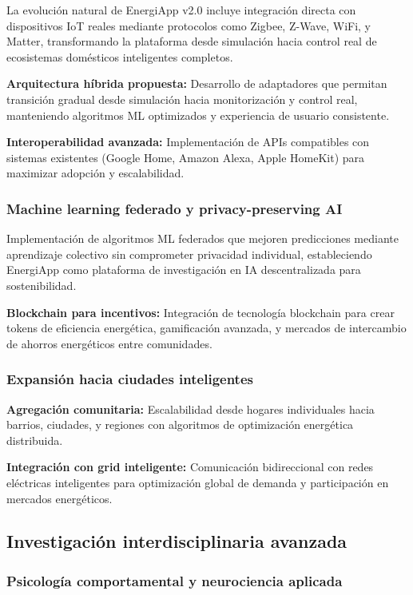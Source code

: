 La evolución natural de EnergiApp v2.0 incluye integración directa con dispositivos IoT reales mediante protocolos como Zigbee, Z-Wave, WiFi, y Matter, transformando la plataforma desde simulación hacia control real de ecosistemas domésticos inteligentes completos.

\textbf{Arquitectura híbrida propuesta:} Desarrollo de adaptadores que permitan transición gradual desde simulación hacia monitorización y control real, manteniendo algoritmos ML optimizados y experiencia de usuario consistente.

\textbf{Interoperabilidad avanzada:} Implementación de APIs compatibles con sistemas existentes (Google Home, Amazon Alexa, Apple HomeKit) para maximizar adopción y escalabilidad.

\subsubsection{Machine learning federado y privacy-preserving AI}

Implementación de algoritmos ML federados que mejoren predicciones mediante aprendizaje colectivo sin comprometer privacidad individual, estableciendo EnergiApp como plataforma de investigación en IA descentralizada para sostenibilidad.

\textbf{Blockchain para incentivos:} Integración de tecnología blockchain para crear tokens de eficiencia energética, gamificación avanzada, y mercados de intercambio de ahorros energéticos entre comunidades.

\subsubsection{Expansión hacia ciudades inteligentes}

\textbf{Agregación comunitaria:} Escalabilidad desde hogares individuales hacia barrios, ciudades, y regiones con algoritmos de optimización energética distribuida.

\textbf{Integración con grid inteligente:} Comunicación bidireccional con redes eléctricas inteligentes para optimización global de demanda y participación en mercados energéticos.

\subsection{Investigación interdisciplinaria avanzada}

\subsubsection{Psicología comportamental y neurociencia aplicada}

